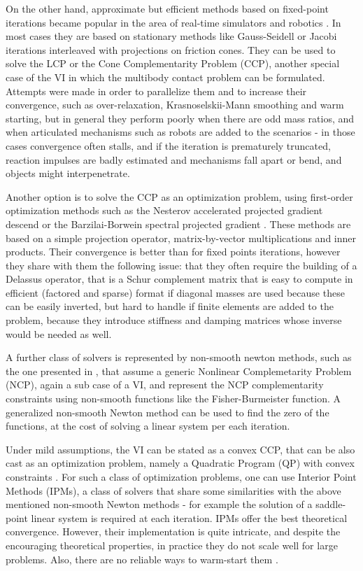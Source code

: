 \documentclass{svproc}
\begin{document}
On the other hand, approximate but efficient methods based on fixed-point iterations became popular in the area of real-time simulators and robotics \cite{Bender2014}.
In most cases they are based on stationary methods like Gauss-Seidell or Jacobi iterations interleaved with projections on friction cones. They can be used to solve the LCP or the Cone Complementarity Problem (CCP), another special case of the VI in which the multibody contact problem can be formulated.
Attempts were made in order to parallelize them and to increase their convergence, such as over-relaxation, Krasnoselskii-Mann smoothing and warm starting, 
\cite{massSplittingRichard2012,TasoraAnitescuCMAME10} %
but in general they perform poorly when there are odd mass ratios, and when articulated mechanisms such as robots are added to the scenarios - in those cases convergence often stalls, and if the iteration is prematurely truncated, reaction impulses are badly estimated and mechanisms fall apart or bend, and objects might interpenetrate. 

Another option is to solve the CCP as an optimization problem, using first-order optimization methods such as 
the Nesterov accelerated projected gradient descend  
\cite{hammadTOG2015}
or the Barzilai-Borwein spectral projected gradient
\cite{heynIJNME2013}. These methods are based on a simple projection operator,  matrix-by-vector multiplications and inner products. Their convergence is better than for fixed points iterations, however they share with them the following issue: that they often require the building of a Delassus operator, that is a Schur complement matrix that is easy to compute in efficient (factored and sparse) format if diagonal masses are used because these can be easily inverted, but hard to handle if finite elements are added to the problem, because they introduce stiffness and damping matrices whose inverse would be needed as well.

A further class of solvers is represented by non-smooth newton methods, such as the one presented in 
\cite{Macklin2019} %
, that assume a generic Nonlinear Complemetarity Problem (NCP), again a sub case of a VI, and represent the NCP complementarity constraints using non-smooth functions like the Fisher-Burmeister function. A generalized non-smooth Newton method can be used to find the zero of the functions, at the cost of solving a linear system per each iteration.

Under mild assumptions, the VI can be stated as a convex CCP, that can be also cast as an optimization problem, namely a Quadratic Program (QP) with convex constraints \cite{anitescuTasora2008}. For such a class of optimization problems, one can use Interior Point Methods (IPMs), a class of solvers that share some similarities with the above mentioned non-smooth Newton methods - for example the solution of a saddle-point linear system is required at each iteration. IPMs offer the best theoretical convergence. However, their implementation is quite intricate, and despite the encouraging theoretical properties, in practice they do not scale well for large problems. Also, there are no reliable ways to warm-start them
\cite{Mangoni2018}
.
\end{document}
